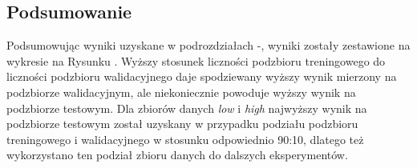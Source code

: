 \subsection{Podsumowanie}

Podsumowując wyniki uzyskane w podrozdziałach -, wyniki zostały zestawione na wykresie na Rysunku .
Wyższy stosunek liczności podzbioru treningowego do liczności podzbioru walidacyjnego daje spodziewany wyższy wynik mierzony na podzbiorze walidacyjnym, ale niekoniecznie powoduje wyższy wynik na podzbiorze testowym.
Dla zbiorów danych \textit{low} i \textit{high} najwyższy wynik na podzbiorze testowym został uzyskany w przypadku podziału podzbioru treningowego i walidacyjnego w stosunku odpowiednio 90:10, dlatego też wykorzystano ten podział zbioru danych do dalszych eksperymentów.

\splitsummarydata

\vspace{0.5cm}

